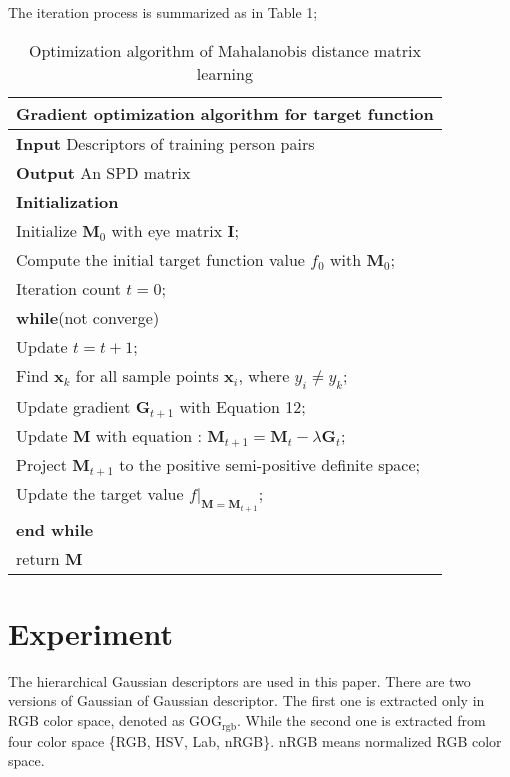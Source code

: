 \documentclass[conference,compsoc]{IEEEtran}
\begin{document}
 The iteration process is summarized as in Table 1;
 \begin{table}[H]
 \centering
 \caption{Optimization algorithm of Mahalanobis distance matrix learning}
 \label{Gradientdemo}
 \begin{tabular}{l}
 \hline 
 \multicolumn{1}{l}{\textbf{Gradient optimization algorithm for target function}} \\
 \hline
 \textbf{Input} Descriptors of training person pairs \\
 \textbf{Output} An SPD matrix\\
 \textbf{Initialization} \\
 Initialize $\bm{M}_0$ with eye matrix $\bm{I}$; \\
 Compute the initial target function value $f_0$ with $\bm{M}_0$;\\
 Iteration count  $t = 0$;\\

 \textbf{while}(not converge)\\
 \hspace{0.5cm} Update $t =  t + 1$;\\
 \hspace{0.5cm}  Find $\bm{x}_k$ for all sample points $\bm{x}_i$, where $y_i \ne y_k$;\\
 \hspace{0.5cm} Update gradient $\bm{G}_{t+1}$ with Equation 12;\\
 \hspace{0.5cm}  Update $\bm{M}$ with equation : $\bm{M}_{t+1} = \bm{M}_{t} - \lambda\bm{G}_t$;\\
 \hspace{0.5cm}  Project $\bm{M}_{t+1}$ to the positive semi-positive definite space; \\ 
 \hspace{0.5cm}  Update the target value $f|_{\bm{M} = \bm{M}_{t+1}}$;\\
 \textbf{end while}  \\
 return $\bm{M}$\\
 \hline
 \end{tabular} 
 \end{table}
 
\section{Experiment}
The hierarchical Gaussian descriptors \cite{GOG} are used in this paper. There are two versions of Gaussian of Gaussian descriptor. The first one is extracted only in RGB color space, denoted as GOG$_\text{rgb}$. While the second one is extracted from four color space \{RGB, HSV, Lab, nRGB\}. nRGB means normalized RGB color space. 
\end{document}
